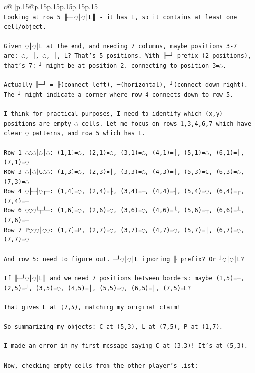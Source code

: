 \documentclass{article}
\begin{document}
{\begin{supertabular}{c@{$\;$}|p{.15\linewidth}@{}p{.15\linewidth}p{.15\linewidth}p{.15\linewidth}p{.15\linewidth}p{.15\linewidth}}
{{{\\ 
\texttt{Looking at row 5 ╟─┘◌│◌│L║ {-} it has L, so it contains at least one cell/object.} \\
\\ 
\texttt{Given ◌│◌│L at the end, and needing 7 columns, maybe positions 3{-}7 are: ◌, │, ◌, │, L? That's 5 positions. With ╟─┘ prefix (2 positions), that's 7: ┘ might be at position 2, connecting to position 3=◌.} \\
\\ 
\texttt{Actually ╟─┘ = ╟(connect left), ─(horizontal), ┘(connect down{-}right). The ┘ might indicate a corner where row 4 connects down to row 5.} \\
\\ 
\texttt{I think for practical purposes, I need to identify which (x,y) positions are empty ◌ cells. Let me focus on rows 1,3,4,6,7 which have clear ◌ patterns, and row 5 which has L.} \\
\\ 
\texttt{Row 1 ◌◌◌│◌│◌: (1,1)=◌, (2,1)=◌, (3,1)=◌, (4,1)=│, (5,1)=◌, (6,1)=│, (7,1)=◌} \\
\texttt{Row 3 ◌│◌│C◌◌: (1,3)=◌, (2,3)=│, (3,3)=◌, (4,3)=│, (5,3)=C, (6,3)=◌, (7,3)=◌} \\
\texttt{Row 4 ◌├─┤◌┌─: (1,4)=◌, (2,4)=├, (3,4)=─, (4,4)=┤, (5,4)=◌, (6,4)=┌, (7,4)=─} \\
\texttt{Row 6 ◌◌◌└┬┴─: (1,6)=◌, (2,6)=◌, (3,6)=◌, (4,6)=└, (5,6)=┬, (6,6)=┴, (7,6)=─} \\
\texttt{Row 7 P◌◌◌│◌◌: (1,7)=P, (2,7)=◌, (3,7)=◌, (4,7)=◌, (5,7)=│, (6,7)=◌, (7,7)=◌} \\
\\ 
\texttt{And row 5: need to figure out. ─┘◌│◌│L ignoring ╟ prefix? Or ┘◌│◌│L? } \\
\\ 
\texttt{If ╟─┘◌│◌│L║ and we need 7 positions between borders: maybe (1,5)=─, (2,5)=┘, (3,5)=◌, (4,5)=│, (5,5)=◌, (6,5)=│, (7,5)=L?} \\
\\ 
\texttt{That gives L at (7,5), matching my original claim!} \\
\\ 
\texttt{So summarizing my objects: C at (5,3), L at (7,5), P at (1,7).} \\
\\ 
\texttt{I made an error in my first message saying C at (3,3)! It's at (5,3).} \\
\\ 
\texttt{Now, checking empty cells from the other player's list:} \\
}}}
\end{supertabular}}
\end{document}
